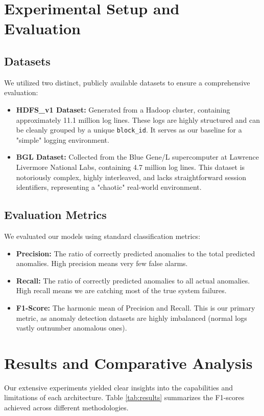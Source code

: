 \documentclass[12pt]{article}
\begin{document}
\section{Experimental Setup and Evaluation}

\subsection{Datasets}
We utilized two distinct, publicly available datasets to ensure a comprehensive evaluation:
\begin{itemize}
    \item \textbf{HDFS\_v1 Dataset:} Generated from a Hadoop cluster, containing approximately 11.1 million log lines. These logs are highly structured and can be cleanly grouped by a unique \texttt{block\_id}. It serves as our baseline for a "simple" logging environment.
    \item \textbf{BGL Dataset:} Collected from the Blue Gene/L supercomputer at Lawrence Livermore National Labs, containing 4.7 million log lines. This dataset is notoriously complex, highly interleaved, and lacks straightforward session identifiers, representing a "chaotic" real-world environment.
\end{itemize}

\subsection{Evaluation Metrics}
We evaluated our models using standard classification metrics:
\begin{itemize}
    \item \textbf{Precision:} The ratio of correctly predicted anomalies to the total predicted anomalies. High precision means very few false alarms.
    \item \textbf{Recall:} The ratio of correctly predicted anomalies to all actual anomalies. High recall means we are catching most of the true system failures.
    \item \textbf{F1-Score:} The harmonic mean of Precision and Recall. This is our primary metric, as anomaly detection datasets are highly imbalanced (normal logs vastly outnumber anomalous ones).
\end{itemize}

\section{Results and Comparative Analysis}
Our extensive experiments yielded clear insights into the capabilities and limitations of each architecture. Table \ref{tab:results} summarizes the F1-scores achieved across different methodologies.
\end{document}
